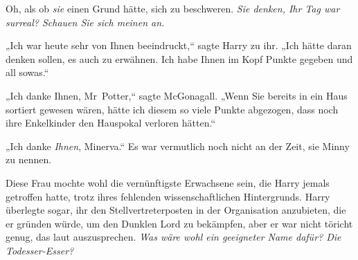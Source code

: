Oh, als ob \emph{sie} einen Grund hätte, sich zu beschweren. \emph{Sie denken, Ihr Tag war surreal? Schauen Sie sich meinen an.}

„Ich war heute sehr von Ihnen beeindruckt,“ sagte Harry zu ihr. „Ich hätte daran denken sollen, es auch zu erwähnen. Ich habe Ihnen im Kopf Punkte gegeben und all sowas.“

„Ich danke Ihnen, Mr~Potter,“ sagte McGonagall. „Wenn Sie bereits in ein Haus sortiert gewesen wären, hätte ich diesem so viele Punkte abgezogen, dass noch ihre Enkelkinder den Hauspokal verloren hätten.“

„Ich danke \emph{Ihnen}, Minerva.“ Es war vermutlich noch nicht an der Zeit, sie Minny zu nennen.

Diese Frau mochte wohl die vernünftigste Erwachsene sein, die Harry jemals getroffen hatte, trotz ihres fehlenden wissenschaftlichen Hintergrunds. Harry überlegte sogar, ihr den Stellvertreterposten in der Organisation anzubieten, die er gründen würde, um den Dunklen Lord zu bekämpfen, aber er war nicht töricht genug, das laut auszusprechen. \emph{Was wäre wohl ein geeigneter Name dafür? Die Todesser-Esser?}

